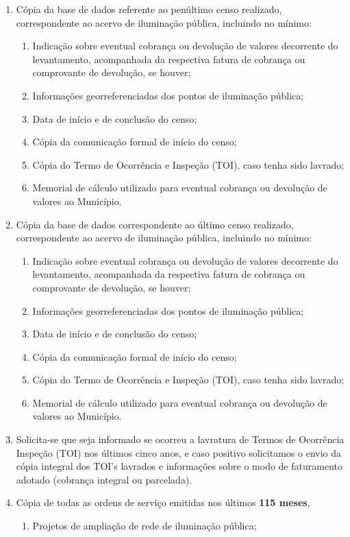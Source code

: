 \begin{enumerate}[resume]
\item Cópia da base de dados referente ao penúltimo censo realizado, correspondente ao acervo de iluminação pública, incluindo no mínimo:
\begin{enumerate}
  \item Indicação sobre eventual cobrança ou devolução de valores decorrente do levantamento, acompanhada da respectiva fatura de cobrança ou comprovante de devolução, se houver;
  \item Informações georreferenciadas dos pontos de iluminação pública;
  \item Data de início e de conclusão do censo; 
  \item Cópia da comunicação formal de início do censo;
  \item Cópia do Termo de Ocorrência e Inspeção (TOI), caso tenha sido lavrado;
  \item Memorial de cálculo utilizado para eventual cobrança ou devolução de valores ao Município. 
\end{enumerate}
\item Cópia da base de dados correspondente ao último censo realizado, correspondente ao acervo de iluminação pública, incluindo no mínimo: 
\begin{enumerate}
  \item Indicação sobre eventual cobrança ou devolução de valores decorrente do levantamento, acompanhada da respectiva fatura de cobrança ou comprovante de devolução, se houver; 
  \item Informações georreferenciadas dos pontos de iluminação pública;
  \item Data de início e de conclusão do censo;
  \item Cópia da comunicação formal de início do censo; 
  \item Cópia do Termo de Ocorrência e Inspeção (TOI), caso tenha sido lavrado;
  \item Memorial de cálculo utilizado para eventual cobrança ou devolução de valores ao Município. 
\end{enumerate}
\item Solicita-se que seja informado se ocorreu a lavratura de Termos de Ocorrência Inspeção (TOI) nos últimos cinco anos, e caso positivo solicitamos o envio da cópia integral dos TOI’s lavrados e informações sobre o modo de faturamento adotado (cobrança integral ou parcelada).
\item Cópia de todas as ordens de serviço emitidas nos últimos \textbf{115 meses},
\begin{enumerate}
  \item Projetos de ampliação de rede de iluminação pública;
\end{enumerate}
\end{enumerate}
